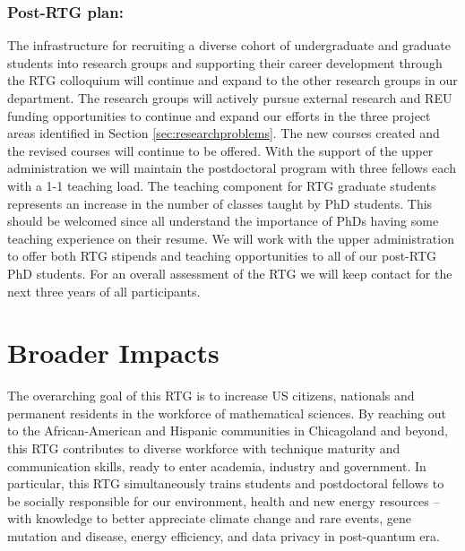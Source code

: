 \documentclass[11pt]{NSFamsart}
\begin{document}
 \subsubsection*{Post-RTG plan:}
The infrastructure for recruiting a diverse cohort of undergraduate and graduate students into research groups and supporting their career development through the RTG colloquium will continue and expand to the other research groups in our department.  The research groups will actively pursue external research and REU funding opportunities to continue and expand our efforts in the three project areas identified in Section \ref{sec:researchproblems}. The new courses created and the revised courses will continue to be offered.
With the support of the upper administration we will maintain the postdoctoral program with three
fellows each with a 1-1 teaching load. The teaching component for RTG graduate students represents
an increase in the number of classes taught by PhD students.  This should be welcomed since all  understand the importance of PhDs having some teaching experience on their resume.
We will work with the upper administration to offer both RTG
stipends and teaching opportunities to all of our post-RTG PhD students.
For an overall assessment of the RTG we will keep contact for the next three years of all participants.


\section{Broader Impacts} 

 

The overarching goal of this RTG is to increase US citizens, nationals and permanent residents in the workforce of  mathematical sciences. 
By reaching out to the African-American and Hispanic communities in Chicagoland and beyond, this RTG   contributes to     diverse    workforce with technique     maturity and communication skills,   ready to enter academia, industry and government. In particular, this RTG simultaneously trains students and postdoctoral fellows to be socially responsible for our environment, health and new energy resources -- with knowledge to better appreciate climate change and rare events, gene mutation and disease, energy efficiency, and data privacy in post-quantum era.   
   
\end{document}
